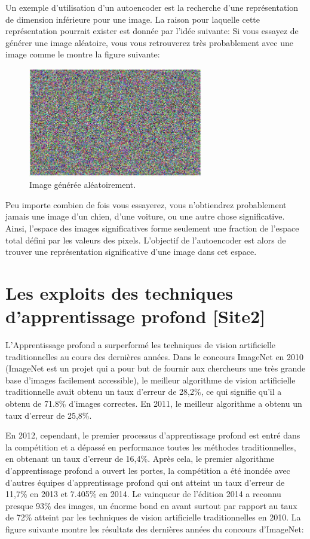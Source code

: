 	Un exemple d'utilisation d'un autoencoder est la recherche d'une représentation de dimension inférieure pour une image. La raison pour laquelle cette représentation pourrait exister est donnée par l'idée suivante: Si vous essayez de générer une image aléatoire, vous vous retrouverez très probablement avec une image comme le montre la figure suivante:

\begin{figure}[H]
	\centering
		\includegraphics[width=3in]{Figures/randomImageGEn.JPG}
	\caption[An Electron]{Image générée aléatoirement.}
	\label{fig:Electron}
\end{figure}

	Peu importe combien de fois vous essayerez, vous n'obtiendrez probablement jamais une image d'un chien, d'une voiture, ou une autre chose significative.
Ainsi, l'espace des images significatives forme seulement une fraction de l'espace total défini par les valeurs des pixels. L'objectif de l'autoencoder est alors de trouver une représentation significative d'une image dans cet espace.

\section{Les exploits des techniques d'apprentissage profond [Site2]}

	L'Apprentissage profond a surperformé les techniques de vision artificielle traditionnelles au cours des dernières années. Dans le concours ImageNet en 2010 (ImageNet est un projet qui a pour but de fournir aux chercheurs une très grande base d'images facilement accessible), le meilleur algorithme de vision artificielle traditionnelle avait obtenu un taux d'erreur de 28,2\%, ce qui signifie qu'il a obtenu de 71.8\% d'images correctes. En 2011, le meilleur algorithme a obtenu un taux d'erreur de 25,8\%. 

	En 2012, cependant, le premier processus d'apprentissage profond est entré dans la compétition et a dépassé en performance toutes les méthodes traditionnelles, en obtenant un taux d'erreur de 16,4\%.
	Après cela, le premier algorithme d'apprentissage profond a ouvert les portes, la compétition a été inondée avec d'autres équipes d'apprentissage profond qui ont atteint un taux d'erreur de 11,7\% en 2013 et 7.405\% en 2014. Le vainqueur de l'édition 2014 a reconnu presque 93\% des images, un énorme bond en avant surtout par rapport au taux de 72\% atteint par les techniques de vision artificielle traditionnelles en 2010. La figure suivante montre les résultats des dernières années du concours d'ImageNet:

